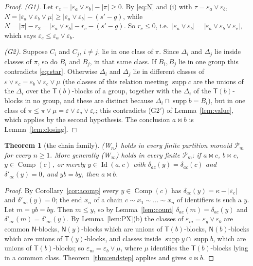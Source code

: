 \documentclass[11pt]{amsart}
\newtheorem{theorem}{Theorem}[section]
\theoremstyle{definition}
\renewcommand{\P}{\mathcal{P}}      %
\newcommand{\supp}{\operatorname{supp}}
\newcommand{\T}{\mathsf{T}}
\newcommand{\N}{\mathsf{N}}
\newcommand{\Id}{\operatorname{Id}}
\newcommand{\Comp}{\operatorname{Comp}}
\newcommand{\mt}{\bowtie}      %
\newcommand{\Wn}[1][n]{\textup{(W$_{#1}$)}}
\begin{document}
\begin{proof}
\emph{(G1).} Let $r_c=|\varepsilon_a\vee\varepsilon_b|-|\pi|\ge0$. By \eqref{eq:N} and (i) with $\tau=\varepsilon_a\vee\varepsilon_b$, $N=|\varepsilon_a\vee\varepsilon_b\vee\mu|\ge|\varepsilon_a\vee\varepsilon_b|-(s'-g)$, while $N=|\pi|-r_2=|\varepsilon_a\vee\varepsilon_b|-r_c-(s'-g)$. So $r_c\le0$, i.e.\ $|\varepsilon_a\vee\varepsilon_b|=|\varepsilon_a\vee\varepsilon_b\vee\varepsilon_c|$, which says $\varepsilon_c\le\varepsilon_a\vee\varepsilon_b$.

\emph{(G2).} Suppose $C_i$ and $C_j$, $i\ne j$, lie in one class of $\pi$. Since $\Delta_i$ and $\Delta_j$ lie inside classes of $\pi$, so do $B_i$ and $B_j$, in that same class. If $B_i,B_j$ lie in one group this contradicts \eqref{eq:star}. Otherwise $\Delta_i$ and $\Delta_j$ lie in different classes of $\varepsilon\vee\varepsilon_c=\varepsilon_b\vee\varepsilon_c\vee\mu$ (the classes of this relation meeting $\supp c$ are the unions of the $\Delta_i$ over the $\T(b)$-blocks of a group, together with the $\Delta_i$ of the $\T(b)$-blocks in no group, and these are distinct because $\Delta_i\cap\supp b=B_i$), but in one class of $\pi\le\pi\vee\mu=\varepsilon\vee\varepsilon_a\vee\varepsilon_c$; this contradicts (G2$'$) of Lemma~\ref{lem:value}, which applies by the second hypothesis. The conclusion $a\mt b$ is Lemma~\ref{lem:closing}.
\end{proof}

\begin{theorem}[the chain family]\label{thm:Wn}
\Wn\ holds in every finite partition monoid $\P_m$ for every $n\ge1$. More generally \textup{(W$_\infty$)} holds in every finite $\P_m$: if $a\mt c$, $b\mt c$, $y\in\Comp(c)$, or merely $y\in\Id(a,c)$ with $\delta_{ac}(y)=\delta_{ac}(c)$ and $\delta'_{ac}(y)=0$, and $yb=by$, then $a\mt b$.
\end{theorem}

\begin{proof}
By Corollary~\ref{cor:acomp} every $y\in\Comp(c)$ has $\delta_{ac}(y)=\kappa-|\varepsilon_c|$ and $\delta'_{ac}(y)=0$; the end $x_n$ of a chain $c\sim x_1\sim\dots\sim x_n$ of identifiers is such a $y$. Let $m=yb=by$. Then $m\le y$, so by Lemma~\ref{lem:count} $\delta_{ac}(m)=\delta_{ac}(y)$ and $\delta'_{ac}(m)=\delta'_{ac}(y)$. By Lemma~\ref{lem:PX}(b) the classes of $\varepsilon_m=\varepsilon_y\vee\varepsilon_b$ are common $\N$-blocks, $\N(y)$-blocks which are unions of $\T(b)$-blocks, $\N(b)$-blocks which are unions of $\T(y)$-blocks, and classes inside $\supp y\cap\supp b$, which are unions of $\T(b)$-blocks; so $\varepsilon_m=\varepsilon_b\vee\mu$, where $\mu$ identifies the $\T(b)$-blocks lying in a common class. Theorem~\ref{thm:endstep} applies and gives $a\mt b$.
\end{proof}
\end{document}
